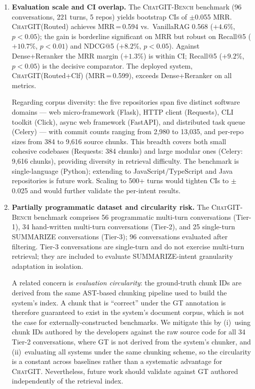 \documentclass[runningheads]{llncs}
\newcommand{\chatgit}{\textsc{ChatGIT}\xspace}
\newcommand{\conv}{\textsc{ChatGIT-Bench}\xspace}
\begin{document}
\begin{enumerate}[leftmargin=*,label=(\arabic*)]
  \item \textbf{Evaluation scale and CI overlap.} The \conv
        benchmark (96 conversations, 221 turns, 5 repos) yields bootstrap
        CIs of $\pm$0.055 MRR. \chatgit (Routed) achieves MRR\,=\,0.594
        vs.\ VanillaRAG 0.568 ($+4.6\%$, $p{<}0.05$); the gain is
        borderline significant on MRR but robust on Recall@5 ($+10.7\%$,
        $p{<}0.01$) and NDCG@5 ($+8.2\%$, $p{<}0.05$).
        Against Dense+Reranker the MRR margin ($+1.3\%$) is within CI;
        Recall@5 ($+9.2\%$, $p{<}0.05$) is the decisive comparator.
        The deployed system, \chatgit (Routed+Clf) (MRR\,=\,0.599),
        exceeds Dense+Reranker on all metrics.

        Regarding corpus diversity: the five repositories span five
        distinct software domains --- web micro-framework (Flask),
        HTTP client (Requests), CLI toolkit (Click), async web
        framework (FastAPI), and distributed task queue (Celery) ---
        with commit counts ranging from 2,980 to 13,035, and per-repo
        sizes from 384 to 9,616 source chunks. This breadth covers both
        small cohesive codebases (Requests: 384 chunks) and large
        modular ones (Celery: 9,616 chunks), providing diversity in
        retrieval difficulty. The benchmark is single-language (Python);
        extending to JavaScript/TypeScript and Java repositories is
        future work. Scaling to 500+ turns would tighten CIs to
        $\pm$0.025 and would further validate the per-intent results.

  \item \textbf{Partially programmatic dataset and circularity risk.}
        The \conv benchmark comprises 56 programmatic multi-turn
        conversations (Tier-1), 34 hand-written multi-turn
        conversations (Tier-2), and 25 single-turn SUMMARIZE
        conversations (Tier-3); 96 conversations evaluated after
        filtering. Tier-3 conversations are single-turn and do not
        exercise multi-turn retrieval; they are included to evaluate
        SUMMARIZE-intent granularity adaptation in isolation.

        A related concern is \emph{evaluation circularity}: the
        ground-truth chunk IDs are derived from the same AST-based
        chunking pipeline used to build the system's index. A chunk
        that is ``correct'' under the GT annotation is therefore
        guaranteed to exist in the system's document corpus, which
        is not the case for externally-constructed benchmarks.
        We mitigate this by (i)~using chunk IDs authored by the
        developers against the raw source code for all 34 Tier-2
        conversations, where GT is not derived from the system's
        chunker, and (ii)~evaluating all systems under the same
        chunking scheme, so the circularity is a constant across
        baselines rather than a systematic advantage for \chatgit.
        Nevertheless, future work should validate against GT authored
        independently of the retrieval index.


\end{enumerate}
\end{document}
